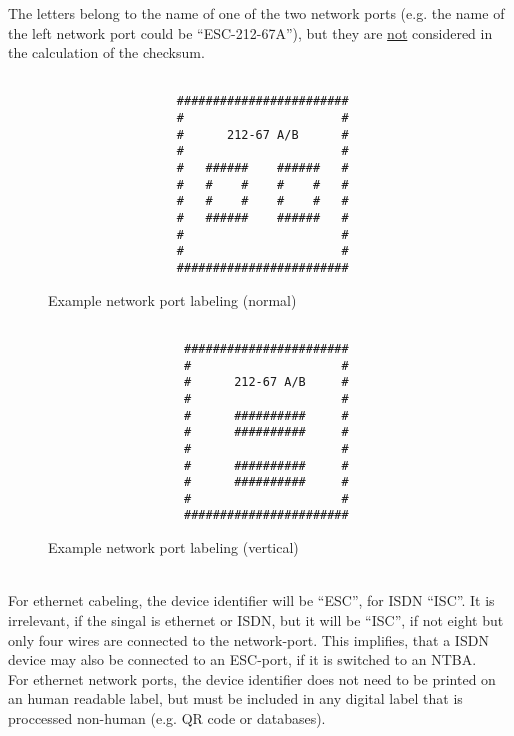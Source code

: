 The letters belong to the name of one of the two network ports (e.g. the
name of the left network port could be ``ESC-212-67A''), but they are
\underline{not} considered in the calculation of the checksum. \\


\begin{minipage}[t]{.42\textwidth}
	\begin{figure}[H]
		\begin{verbatim}

			      ########################
			      #                      #
			      #      212-67 A/B      #
			      #                      #
			      #   ######    ######   #
			      #   #    #    #    #   #
			      #   #    #    #    #   #
			      #   ######    ######   #
			      #                      #
			      #                      #
			      ########################
		\end{verbatim}

		\caption{Example network port labeling (normal)}
	\end{figure}
\end{minipage}
\hfill
\begin{minipage}[t]{.42\textwidth}
	\begin{figure}[H]
		\begin{verbatim}

			       #######################
			       #                     #
			       #      212-67 A/B     #
			       #                     #
			       #      ##########     #
			       #      ##########     #
			       #                     #
			       #      ##########     #
			       #      ##########     #
			       #                     #
			       #######################
		\end{verbatim}

		\caption{Example network port labeling (vertical)}
	\end{figure}
\end{minipage} \\

For ethernet cabeling, the device identifier will be ``ESC'', for ISDN ``ISC''.
It is irrelevant, if the singal is ethernet or ISDN, but it will be ``ISC'', if
not eight but only four wires are connected to the network-port. This implifies,
that a ISDN device may also be connected to an ESC-port, if it is switched to
an NTBA. \\

For ethernet network ports, the device identifier does not need to be printed
on an human readable label, but must be included in any digital label that is
proccessed non-human (e.g. QR code or databases).
